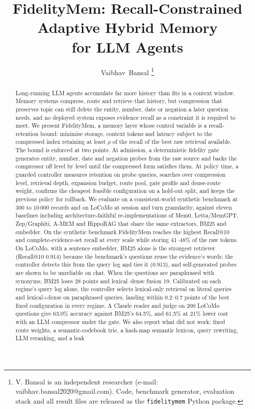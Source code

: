 \documentclass[journal]{IEEEtran}
\begin{document}
\title{FidelityMem: Recall-Constrained Adaptive Hybrid Memory\\ for LLM Agents}

\author{Vaibhav~Bansal%
\thanks{V. Bansal is an independent researcher (e-mail: vaibhav.bansal2020@gmail.com). Code, benchmark generator, evaluation stack and all result files are released as the \texttt{fidelitymem} Python package.}}


\maketitle

\begin{abstract}
Long-running LLM agents accumulate far more history than fits in a context window. Memory systems compress, route and retrieve that history, but compression that preserves topic can still delete the entity, number, date or negation a later question needs, and no deployed system exposes evidence recall as a constraint it is required to meet. We present FidelityMem, a memory layer whose control variable is a recall-retention bound: minimise storage, context tokens and latency subject to the compressed index retaining at least $\rho$ of the recall of the best raw retrieval available. The bound is enforced at two points. At admission, a deterministic fidelity gate generates entity, number, date and negation probes from the raw source and backs the compressor off level by level until the compressed form satisfies them. At policy time, a guarded controller measures retention on probe queries, searches over compression level, retrieval depth, expansion budget, route pool, gate profile and dense-route weight, confirms the cheapest feasible configuration on a hold-out split, and keeps the previous policy for rollback. We evaluate on a consistent-world synthetic benchmark at 300 to 10\,000 records and on LoCoMo at session and turn granularity, against eleven baselines including architecture-faithful re-implementations of Mem0, Letta/MemGPT, Zep/Graphiti, A-MEM and HippoRAG that share the same extractors, BM25 and embedder. On the synthetic benchmark FidelityMem reaches the highest Recall@10 and complete-evidence-set recall at every scale while storing 41--48\% of the raw tokens. On LoCoMo, with a sentence embedder, BM25 alone is the strongest retriever (Recall@10 0.914) because the benchmark's questions reuse the evidence's words; the controller detects this from the query log and ties it (0.913), and self-generated probes are shown to be unreliable on chat. When the questions are paraphrased with synonyms, BM25 loses 28 points and lexical--dense fusion 19. Calibrated on each regime's query log alone, the controller selects lexical-only retrieval on literal queries and lexical+dense on paraphrased queries, landing within 0.2--0.7 points of the best fixed configuration in every regime. A Claude reader and judge on 200 LoCoMo questions give 63.0\% accuracy against BM25's 64.5\%, and 61.5\% at 21\% lower cost with an LLM compressor under the gate. We also report what did not work: fixed route weights, a semantic-codebook trie, a hash-map semantic lexicon, query rewriting, LLM reranking, and a leak 
\end{abstract}
\end{document}
